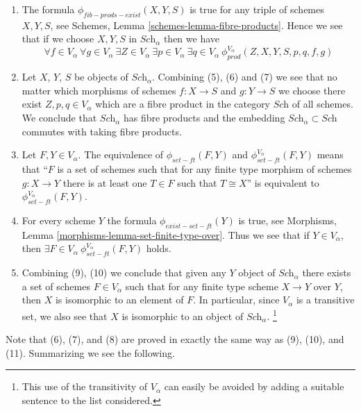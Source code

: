 \begin{enumerate}
in $\textit{Sch}$ if and only if
$\phi_{prod}^{V_\alpha}(Z, X, Y, S, p, q, f, g)$ holds.%
\footnote{At this point in the discussion we do not know
what, if anything, $\phi^{V_\alpha}_{prod}$ signifies in terms of the
category $\textit{Sch}_\alpha$. It may very well depend on
the precise shape of the formula chosen.}
\item The formula $\phi_{fib-prods-exist}(X, Y, S)$ is true
for any triple of schemes $X, Y, S$, see Schemes,
Lemma \ref{schemes-lemma-fibre-products}. Hence we see that if
we choose $X, Y, S$ in $\textit{Sch}_\alpha$ then we have
$$
\forall f\in V_\alpha\ \forall g\in V_\alpha\ 
\exists Z\in V_\alpha\ \exists p\in V_\alpha\ \exists q\in V_\alpha\ 
\phi_{prod}^{V_\alpha}(Z, X, Y, S, p, q, f, g)
$$
\item Let $X$, $Y$, $S$ be objects of $\textit{Sch}_\alpha$.
Combining (5), (6) and (7) we see that no matter which morphisms
of schemes $f : X \to S$ and $g : Y \to S$ we choose there exist
$Z, p, q \in V_\alpha$ which are a fibre product in the
category $\textit{Sch}$ of all schemes. We conclude that
$\textit{Sch}_\alpha$ has fibre products and the embedding
$\textit{Sch}_\alpha \subset \textit{Sch}$ commutes with
taking fibre products.
\item Let $F, Y \in V_\alpha$. The equivalence of
$\phi_{set-ft}(F, Y)$ and $\phi^{V_\alpha}_{set-ft}(F, Y)$
means that ``$F$ is a set of schemes such that for any finite
type morphism of schemes $g : X \to Y$ there is at least one
$T \in F$ such that $T \cong X$'' is equivalent to
$\phi^{V_\alpha}_{set-ft}(F, Y)$.
\item For every scheme $Y$ the formula $\phi_{exist-set-ft}(Y)$
is true, see Morphisms, Lemma \ref{morphisms-lemma-set-finite-type-over}.
Thus we see that if $Y \in V_\alpha$, then
$\exists F \in V_\alpha\ \phi^{V_\alpha}_{set-ft}(F, Y)$ holds.
\item Combining (9), (10) we conclude that given any
$Y$ object of $\textit{Sch}_\alpha$ there exists a set of schemes
$F \in V_\alpha$ such that for any finite type scheme
$X \to Y$ over $Y$, then $X$ is isomorphic to an element
of $F$. In particular, since $V_\alpha$ is a transitive set,
we also see that $X$ is isomorphic to an object of $\textit{Sch}_\alpha$.%
\footnote{This use of the transitivity of $V_\alpha$ can easily be
avoided by adding a suitable sentence to the list considered.}
\end{enumerate}
Note that (6), (7), and (8) are proved in exactly the same way
as (9), (10), and (11).
Summarizing we see the following.

